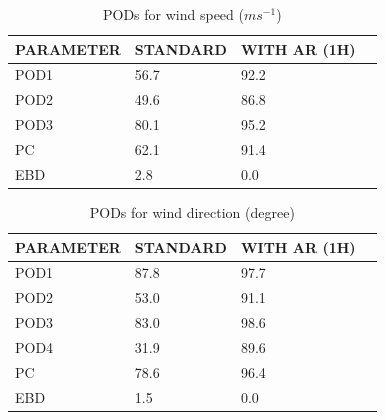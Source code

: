 \documentclass[a4paper,english]{article}
\begin{document}
\newpage

\clearpage
\begin{table}[]
\begin{center}
\begin{tabular}{|l|l|l|l|}
\hline
\multicolumn{1}{|c|}{\cellcolor[HTML]{C0C0C0}\textbf{PARAMETER}} & \multicolumn{1}{c|}{\cellcolor[HTML]{C0C0C0}\textbf{STANDARD}} & \multicolumn{1}{c|}{\cellcolor[HTML]{C0C0C0}\textbf{WITH AR (1H)}} \\
\hline
\cellcolor[HTML]{C0C0C0}POD1  & 56.7                                & 92.2         \\
\cellcolor[HTML]{C0C0C0}POD2  & 49.6                                & 86.8         \\
\cellcolor[HTML]{C0C0C0}POD3  & 80.1                                & 95.2         \\
\cellcolor[HTML]{C0C0C0}PC    & 62.1                                  & 91.4           \\
\cellcolor[HTML]{C0C0C0}EBD   & 2.8                                 & 0.0          \\
\hline
\end{tabular}
\caption{PODs for wind speed ($m s^{-1}$)}
\end{center}
\end{table}
\begin{table}[]
\begin{center}
\begin{tabular}{|l|l|l|l|}
\hline
\multicolumn{1}{|c|}{\cellcolor[HTML]{C0C0C0}\textbf{PARAMETER}} & \multicolumn{1}{c|}{\cellcolor[HTML]{C0C0C0}\textbf{STANDARD}} & \multicolumn{1}{c|}{\cellcolor[HTML]{C0C0C0}\textbf{WITH AR (1H)}} \\
\hline
\cellcolor[HTML]{C0C0C0}POD1  & 87.8      & 97.7     \\
\cellcolor[HTML]{C0C0C0}POD2  & 53.0      & 91.1     \\
\cellcolor[HTML]{C0C0C0}POD3  & 83.0      & 98.6     \\
\cellcolor[HTML]{C0C0C0}POD4  & 31.9      & 89.6     \\
\cellcolor[HTML]{C0C0C0}PC    & 78.6        & 96.4       \\
\cellcolor[HTML]{C0C0C0}EBD   & 1.5       & 0.0      \\
\hline
\end{tabular}
\caption{PODs for wind direction (degree)}
\end{center}
\end{table}
\end{document}
